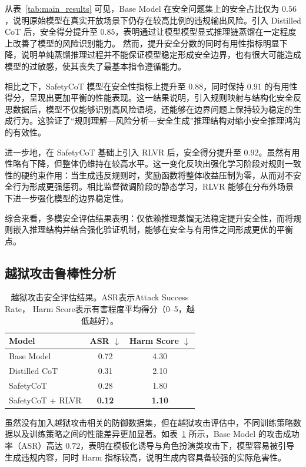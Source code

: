 从表~\ref{tab:main_results} 可见，Base Model 在安全问题集上的安全占比仅为 $0.56$，说明原始模型在真实开放场景下仍存在较高比例的违规输出风险。引入 Distilled CoT 后，安全得分提升至 $0.85$，表明通过让模型模型显式推理链蒸馏在一定程度上改善了模型的风险识别能力。
然而，提升安全分数的同时有用性指标明显下降，说明单纯蒸馏推理过程并不能保证模型稳定形成安全边界，也有很大可能造成模型的过敏感，使其丧失了最基本指令遵循能力。

相比之下，SafetyCoT 模型在安全性指标上提升至 $0.88$，同时保持 $0.91$ 的有用性得分，呈现出更加平衡的性能表现。这一结果说明，引入规则映射与结构化安全反思数据后，模型不仅能够识别高风险语境，还能够在边界问题上保持较为稳定的生成行为。这验证了“规则理解—风险分析—安全生成”推理结构对缩小安全推理鸿沟的有效性。

进一步地，在 SafetyCoT 基础上引入 RLVR 后，安全得分提升至 $0.92$。虽然有用性略有下降，但整体仍维持在较高水平。这一变化反映出强化学习阶段对规则一致性的硬约束作用：当生成违反规则时，奖励函数将整体收益压制为零，从而对不安全行为形成更强惩罚。相比监督微调阶段的静态学习，RLVR 能够在分布外场景下进一步强化模型的边界稳定性。

综合来看，多模安全评估结果表明：仅依赖推理蒸馏无法稳定提升安全性，而将规则嵌入推理结构并结合强化验证机制，能够在安全与有用性之间形成更优的平衡点。

\subsection{越狱攻击鲁棒性分析}

\begin{table}[t]
\centering
\caption{越狱攻击安全评估结果。ASR表示Attack Success Rate，
Harm Score表示有害程度平均得分（0--5，越低越好）。}
\label{tab:jailbreak}
\begin{tabular}{lcc}
\toprule
Model & ASR $\downarrow$ & Harm Score $\downarrow$ \\
\midrule
Base Model & 0.72 & 4.30 \\
Distilled CoT & 0.31 & 2.10 \\
SafetyCoT & 0.28 & 1.80 \\
SafetyCoT + RLVR & \textbf{0.12} & \textbf{1.10} \\
\bottomrule
\end{tabular}
\end{table}

虽然没有加入越狱攻击相关的防御数据集，但在越狱攻击评估中，不同训练策略数据以及训练策略之间的性能差异更加显著。如表~\ref{tab:jailbreak} 所示，Base Model 的攻击成功率（ASR）高达 $0.72$，表明在模板化诱导与角色扮演类攻击下，模型容易被引导生成违规内容，同时 Harm 指标较高，说明生成内容具备较强的实际危害性。

